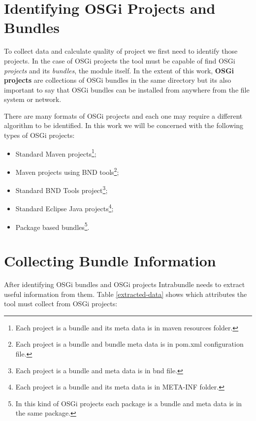 \section{Identifying OSGi Projects and Bundles}
To collect data and calculate quality of project we first need to identify those projects. In the case of OSGi projects the tool must be capable of find OSGi \emph{projects} and its \emph{bundles}, the module itself. In the extent of this work, \textbf{OSGi projects} are collections of OSGi bundles in the same directory but its also important to say that OSGi bundles can be installed from anywhere from the file system or network.

There are many formats of OSGi projects and each one may require a different algorithm to be identified. In this work we will be concerned with the following types of OSGi projects: 

\begin{itemize}
\item Standard Maven projects\footnote{Each project is a bundle and its meta data is in maven resources folder.};
\item Maven projects using BND tools\footnote{Each project is a bundle and bundle meta data is in pom.xml configuration file.};  
\item Standard BND Tools project\footnote{Each project is a bundle and meta data is in bnd file.};
\item Standard Eclipse Java projects\footnote{Each project is a bundle and its meta data is in META-INF folder.};
\item Package based bundles\footnote{In this kind of OSGi projects each package is a bundle and meta data is in the same package.}.
\end{itemize}

\section{Collecting Bundle Information}
\label{sec:collecting-data}
After identifying OSGi bundles and OSGi projects Intrabundle needs to extract useful information from them. Table \ref{extracted-data} shows which attributes the tool must collect from OSGi projects:

